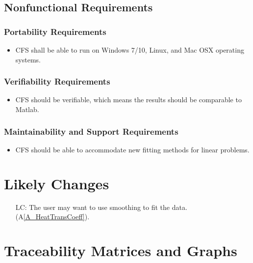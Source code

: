 \documentclass[12pt]{article}
\newcommand{\aref}[1]{A\ref{#1}}
\newcounter{lcnum} %
\newcommand{\famname}{CFS} %
\begin{document}
\subsection{Nonfunctional Requirements}

\subsubsection{Portability Requirements}
\begin{itemize}
	\item \famname{} shall be able to run on Windows 7/10, Linux, and Mac OSX
	operating systems.
\end{itemize}

\subsubsection{Verifiability Requirements}
\begin{itemize}
	\item \famname{} should be verifiable, which means the results should be comparable to Matlab.
\end{itemize}

\subsubsection{Maintainability and Support Requirements}
\begin{itemize}
	\item \famname{} should be able to accommodate new fitting methods for linear problems. 
\end{itemize}	
	


\section{Likely Changes}    

\noindent \begin{itemize}

\item[LC\refstepcounter{lcnum}\thelcnum\label{LC_Smoothing}:]The
user may want to use smoothing to fit the data.(\aref{A_HeatTransCoeff}). 

\end{itemize}

\section{Traceability Matrices and Graphs}
\end{document}
